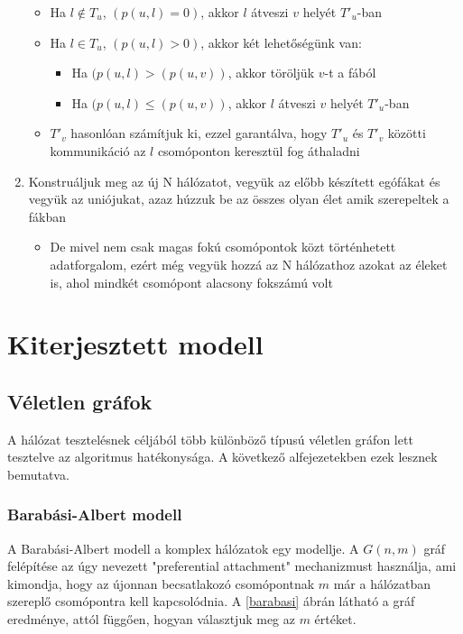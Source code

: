 \documentclass[12pt]{report}
\begin{document}
\begin{enumerate}
	\begin{itemize}
		\item Ha \(l \notin T_u\), \((p(u, l) = 0)\), akkor \(l\) átveszi \(v\) helyét \(T'_u\)-ban
		\item Ha \(l \in T_u\), \((p(u, l) > 0)\), akkor két lehetőségünk van:
		\begin{itemize}
			\item Ha \((p(u, l) > (p(u, v))\), akkor töröljük \(v\)-t a fából
			\item Ha \((p(u, l) \le (p(u, v))\), akkor \(l\) átveszi \(v\) helyét \(T'_u\)-ban
		\end{itemize}
		\item \(T'_v\) hasonlóan számítjuk ki, ezzel garantálva, hogy \(T'_u\) és \(T'_v\) közötti kommunikáció az \(l\) csomóponton keresztül fog áthaladni
	\end{itemize}
	\item Konstruáljuk meg az új N hálózatot, vegyük az előbb készített egófákat és vegyük az uniójukat, azaz húzzuk be az összes olyan élet amik szerepeltek a fákban
	\begin{itemize}
		\item     De mivel nem csak magas fokú csomópontok közt történhetett adatforgalom, ezért még vegyük hozzá az N hálózathoz azokat az éleket is, ahol mindkét csomópont alacsony fokszámú volt
	\end{itemize}
\end{enumerate}

\chapter{Kiterjesztett modell}

\section{Véletlen gráfok}

A hálózat tesztelésnek céljából több különböző típusú véletlen gráfon lett tesztelve az algoritmus hatékonysága.
A következő alfejezetekben ezek lesznek bemutatva.

\subsection{Barabási-Albert modell}

A Barabási-Albert modell \cite{RevModPhys.74.47} a komplex hálózatok egy modellje. 
A \(G(n, m)\) gráf felépítése az úgy nevezett "preferential attachment" mechanizmust használja, ami kimondja, hogy az újonnan becsatlakozó csomópontnak \(m\) már a hálózatban szereplő csomópontra kell kapcsolódnia. A \ref{barabasi} ábrán látható a gráf eredménye, attól függően, hogyan választjuk meg az \(m\) értéket.
\end{document}
